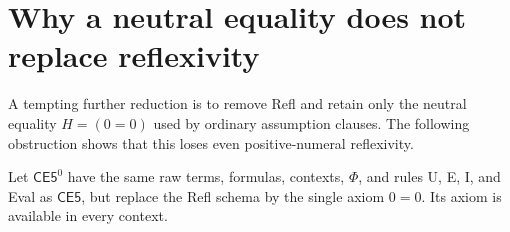 \section{Why a neutral equality does not replace reflexivity}
\label{sec:reflexivity-obstruction}

A tempting further reduction is to remove Refl and retain only the
neutral equality $H=(0=0)$ used by ordinary assumption clauses.
The following obstruction shows that this loses even positive-numeral
reflexivity.

Let $\mathsf{CE5}^{0}$ have the same raw terms, formulas, contexts,
$\Phi$, and rules U, E, I, and Eval as $\mathsf{CE5}$, but replace
the Refl schema by the single axiom $0=0$. Its axiom is available in
every context.

